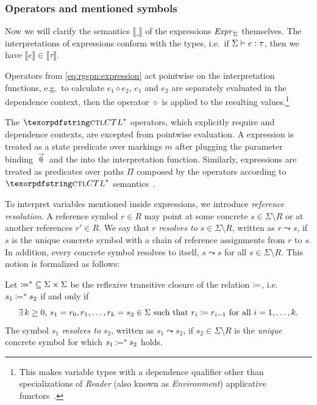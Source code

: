 \subsubsection{Operators and mentioned symbols}

Now we will clarify the semantics \(\llbracket \_ \rrbracket\) of the expressions \(\textrm{\itshape Expr\/}_\Sigma\) themselves. The interpretations of expressions conform with the types, i.e.~if \(\Sigma \vdash e \mathrel{\vcentcolon} \tau\), then we have \(\llbracket e \rrbracket \in \llbracket \tau \rrbracket\).

Operators from \vref{eq:rgspn:expression} act pointwise on the interpretation functions, e.g.~to calculate \(e_1 \mathbin{\diamond} e_2\), \(e_1\) and \(e_2\) are separately evaluated in the dependence context, then the operator \(\diamond\) is applied to the resulting values.\footnote{This makes variable types with a dependence qualifier other than  specializations of \emph{Reader} (also known as \emph{Environment}) applicative functors~\citep[Section~8]{McBride08applicative}.}

The \(\textabbr{CTL}^*\) operators, which explicitly require  and  dependence contexts, are excepted from pointwise evaluation. A  expression is treated as a state predicate over markings \(m\) after plugging the parameter binding \(\vec{\uptheta}\) and the  into the interpretation function. Similarly,  expressions are treated as predicates over paths \(\Pi\) composed by the operators according to \(\textabbr{CTL}^*\) semantics~.

To interpret variables mentioned inside expressions, we introduce \emph{reference resolution}. A reference symbol \(r \in R\) may point at some concrete \(s \in \Sigma \setminus R\) or at another references \(r' \in R\). We say that \(r\) \emph{resolves to} \(s \in \Sigma \setminus R\), written as \(r \leadsto s\), if \(s\) is the unique concrete symbol with a chain of reference assignments from \(r\) to \(s\). In addition, every concrete symbol resolves to itself, \(s \leadsto s\) for all \(s \in \Sigma \setminus R\). This notion is formalized as follows:
\begin{dfn}\label{dfn:rgspn:resolution}
  Let \({\coloneq^*} \subseteq \Sigma \times \Sigma\) be the reflexive transitive closure of the relation \(\coloneq\), i.e. \(s_1 \mathbin{\coloneq^*} s_2\) if and only if
  \begin{equation}
    \text{\(\exists\, k \ge 0\), \(s_1 = r_0, r_1, \ldots, r_k = s_2 \in \Sigma\) such that \(r_i \coloneq r_{i - 1}\) for all \(i = 1, \ldots, k\).}
  \end{equation}
  The symbol \(s_1\) \emph{resolves to} \(s_2\), written as \(s_1 \leadsto s_2\), if \(s_2 \in \Sigma \setminus R\) is the \emph{unique} concrete symbol for which \(s_1 \mathbin{\coloneq^*} s_2\) holds.
\end{dfn}

